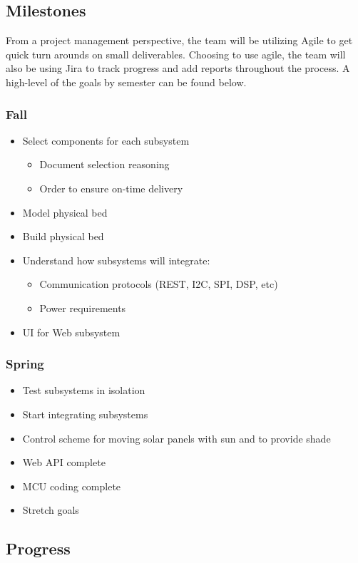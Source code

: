 \subsection{Milestones}
From a project management perspective, the team will be utilizing Agile to get quick turn arounds on small deliverables. Choosing to use agile, the team will also be using Jira to track progress and add reports throughout the process. A high-level of the goals by semester can be found below.
\subsubsection{Fall}
\begin{itemize}
    \item Select components for each subsystem
    \begin{itemize}
        \item Document selection reasoning
        \item Order to ensure on-time delivery
    \end{itemize}
    \item Model physical bed
    \item Build physical bed
    \item Understand how subsystems will integrate:
    \begin{itemize}
        \item Communication protocols (REST, I2C, SPI, DSP, etc)
        \item Power requirements
    \end{itemize}
    \item UI for Web subsystem
\end{itemize}
\subsubsection{Spring}
\begin{itemize}
    \item Test subsystems in isolation
    \item Start integrating subsystems
    \item Control scheme for moving solar panels with sun and to provide shade
    \item Web API complete
    \item MCU coding complete
    \item Stretch goals
\end{itemize}

\subsection{Progress}

